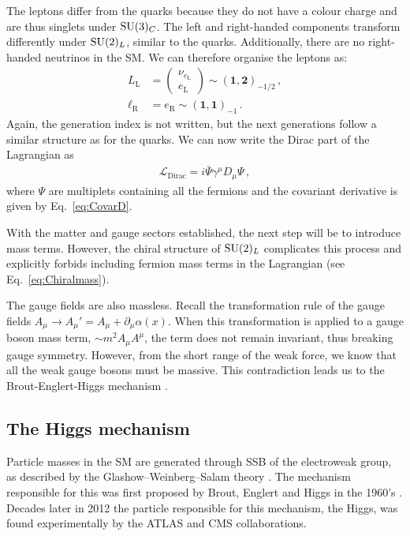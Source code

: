 The leptons differ from the quarks because they do not have a colour charge and are thus singlets under $\mathrm{SU}(3)_C$. The left and right-handed components transform differently under $\mathrm{SU}(2)_L$, similar to the quarks. Additionally, there are no right-handed neutrinos in the SM. We can therefore organise the leptons as:
\begin{align}
    L_{\mathrm{L}} &= \begin{pmatrix} \nu_{e_\mathrm{L}} \\ e_{\mathrm{L}} \end{pmatrix} \sim (\mathbf{1}, \mathbf{2})_{-1/2}\,, \\
    \ell_\mathrm{R}&=e_{\mathrm{R}} \sim (\mathbf{1}, \mathbf{1})_{-1}\,.
\end{align}  
Again, the generation index is not written, but the next generations follow a similar structure as for the quarks. 
We can now write the Dirac part of the Lagrangian as 
\begin{align}
    \mathcal{L}_{\mathrm{Dirac}} = i \bar{\Psi} \gamma^\mu D_\mu \Psi\,,\label{eq:LDirac}
\end{align}
where $\Psi$ are multiplets containing all the fermions and the covariant derivative is given by Eq.~\eqref{eq:CovarD}. 

With the matter and gauge sectors established, the next step will be to introduce mass terms. However, the chiral structure of $\mathrm{SU}(2)_L$ complicates this process and explicitly forbids including fermion mass terms in the Lagrangian (see Eq.~\eqref{eq:Chiralmass}). 

The gauge fields are also massless. Recall the transformation rule of the gauge fields $A_\mu\to A_\mu'=A_\mu+\partial_\mu\alpha(x)$. When this transformation is applied to a gauge boson mass term, $\sim m^2A_\mu A^\mu$, the term does not remain invariant, thus breaking gauge symmetry. However, from the short range of the weak force, we know that all the weak gauge bosons must be massive. This contradiction leads us to the Brout-Englert-Higgs mechanism \cite{Englert:1964et,Higgs:1964pj}. 

\subsection{The Higgs mechanism} \label{sec:SMHiggs}
Particle masses in the SM are generated through SSB of the electroweak group, as described by the Glashow--Weinberg--Salam theory \cite{Glashow:1961tr, Weinberg:1967tq, Salam:1964ry}. The mechanism responsible for this was first proposed by Brout, Englert and Higgs in the 1960's \cite{Englert:1964et,Higgs:1964pj}. Decades later in 2012 the particle responsible for this mechanism, the Higgs, was found experimentally by the ATLAS \cite{ATLAS:2012yve} and CMS \cite{CMS:2012qbp} collaborations. 

